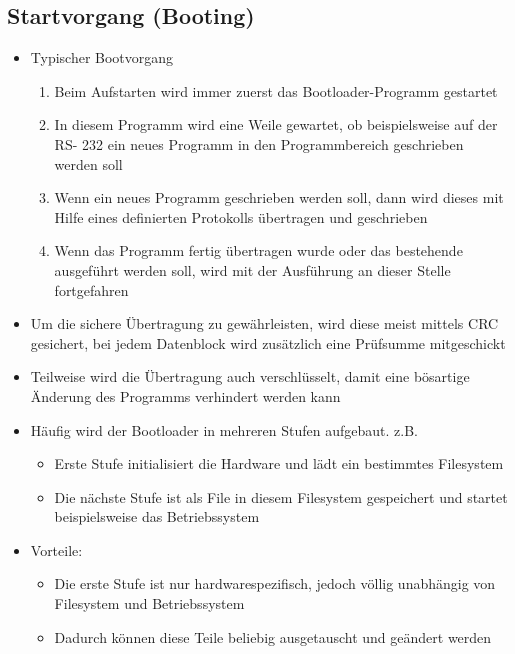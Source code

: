 \subsection{Startvorgang (Booting) }
\begin{itemize}
	\item Typischer Bootvorgang
	\begin{enumerate}
		\item Beim Aufstarten wird immer zuerst das
		Bootloader-Programm gestartet
		\item In diesem Programm wird eine Weile
		gewartet, ob beispielsweise auf der RS-
		232 ein neues Programm in den
		Programmbereich geschrieben werden
		soll
		\item Wenn ein neues Programm geschrieben
		werden soll, dann wird dieses mit Hilfe
		eines definierten Protokolls übertragen
		und geschrieben
		\item Wenn das Programm fertig übertragen
		wurde oder das bestehende ausgeführt
		werden soll, wird mit der Ausführung an
		dieser Stelle fortgefahren
	\end{enumerate}
	\item Um die sichere Übertragung zu gewährleisten, wird diese meist mittels CRC gesichert, bei jedem Datenblock wird zusätzlich eine Prüfsumme mitgeschickt
	\item Teilweise wird die Übertragung auch verschlüsselt, damit eine bösartige Änderung des Programms verhindert werden kann
	\item Häufig wird der Bootloader in mehreren Stufen aufgebaut. z.B.
	\begin{itemize}
		\item Erste Stufe initialisiert die Hardware und lädt ein bestimmtes Filesystem
		\item Die nächste Stufe ist als File in diesem Filesystem gespeichert und startet beispielsweise das Betriebssystem
	\end{itemize}
	\item Vorteile:
	\begin{itemize}
		\item Die erste Stufe ist nur hardwarespezifisch, jedoch völlig unabhängig von Filesystem und Betriebssystem
		\item Dadurch können diese Teile beliebig ausgetauscht und geändert werden
	\end{itemize}
\end{itemize}

